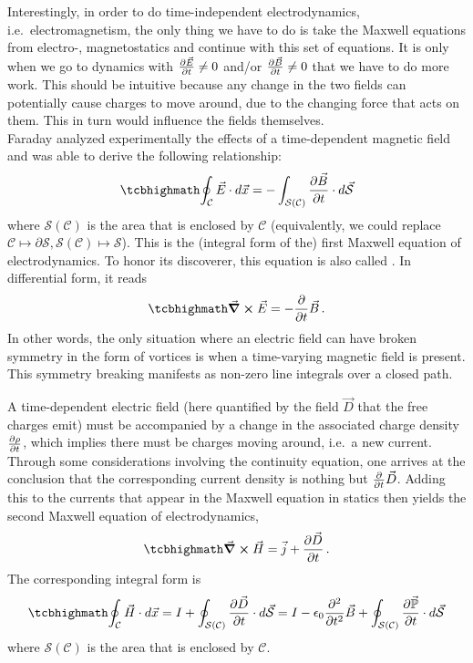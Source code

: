 \documentclass[../class_mech_main.tex]{subfiles}
\begin{document}
Interestingly, in order to do time-independent electrodynamics, i.e.~electromagnetism, the only thing we have to do is take the Maxwell equations from electro-, magnetostatics and continue with this set of equations. It is only when we go to dynamics with $\pdv{\vec{E}}{t} \neq 0$ and/or $\pdv{\vec{B}}{t} \neq 0$ that we have to do more work. This should be intuitive because any change in the two fields can potentially cause charges to move around, due to the changing force that acts on them. This in turn would influence the fields themselves.\\


Faraday analyzed experimentally the effects of a time-dependent magnetic field and was able to derive the following relationship:
\begin{equation}\label{eq:maxwell_edyn_one_int}
    \eqbox{
        \oint_\mathcal{C} \vec{E} \cdot d\vec{x} = - \int_{\mathcal{S}(\mathcal{C})} \pdv{\vec{B}}{t} \cdot d\vec{\mathcal{S}}
    }
\end{equation}
where $\mathcal{S}(\mathcal{C})$ is the area that is enclosed by $\mathcal{C}$ (equivalently, we could replace $\mathcal{C} \mapsto \partial \mathcal{S}, \mathcal{S}(\mathcal{C}) \mapsto \mathcal{S}$). This is the (integral form of the) first Maxwell equation of electrodynamics. To honor its discoverer, this equation is also called . In differential form, it reads
\begin{equation}\label{eq:maxwell_edyn_one_diff}
    \eqbox{
        \curl \vec{E} = - \pdv{t} \vec{B}
    } \, .
\end{equation}
In other words, the only situation where an electric field can have broken symmetry in the form of vortices is when a time-varying magnetic field is present. This symmetry breaking manifests as non-zero line integrals over a closed path.


A time-dependent electric field (here quantified by the field $\vec{D}$ that the free charges emit) must be accompanied by a change in the associated charge density $\pdv{\rho}{t}$, which implies there must be charges moving around, i.e.~a new current. Through some considerations involving the continuity equation, one arrives at the conclusion that the corresponding current density is nothing but $\pdv{t} \vec{D}$. Adding this to the currents that appear in the Maxwell equation in statics then yields the second Maxwell equation of electrodynamics,
\begin{equation}\label{eq:maxwell_edyn_two_diff}
    \eqbox{
        \curl \vec{H} = \vec{j} + \pdv{\vec{D}}{t}
    } \, .
\end{equation}
The corresponding integral form is 
\begin{equation}\label{eq:maxwell_edyn_two_int}
    \eqbox{
        \oint_\mathcal{C} \vec{H} \cdot d\vec{x} = I + \oint_{\mathcal{S}(\mathcal{C})} \pdv{\vec{D}}{t} \cdot d\vec{\mathcal{S}} = I - \epsilon_0 \pdv[2]{t} \vec{B} + \oint_{\mathcal{S}(\mathcal{C})} \pdv{\vec{\mathbb{P}}}{t} \cdot d\vec{\mathcal{S}}
    }
\end{equation}
where $\mathcal{S}(\mathcal{C})$ is the area that is enclosed by $\mathcal{C}$.
\end{document}
